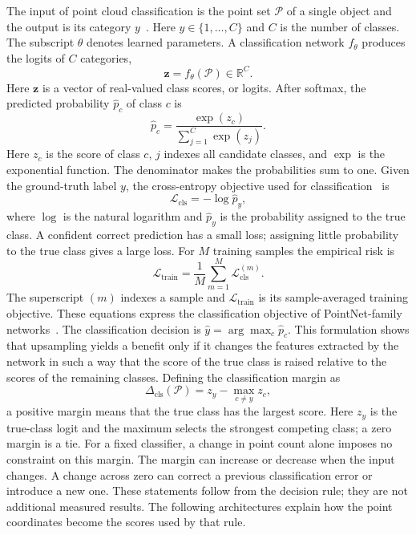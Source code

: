 The input of point cloud classification is the point set $\mathcal{P}$ of a
single object and the output is its category $y$~\cite{qi2017pointnetpp,qi2017pointnet}. Here $y\in\{1,\ldots,C\}$ and $C$ is the number of classes. The subscript $\theta$ denotes learned parameters. A classification network
$f_\theta$ produces the logits of $C$ categories,
%
\begin{equation}
    \label{eq:logits}
    \mathbf{z} = f_\theta(\mathcal{P}) \in \mathbb{R}^{C}.
\end{equation}
%
Here $\mathbf z$ is a vector of real-valued class scores, or logits. After softmax, the predicted probability $\hat p_c$ of class $c$ is
%
\begin{equation}
    \label{eq:softmax}
    \hat{p}_c = \frac{\exp(z_c)}{\sum_{j=1}^{C} \exp(z_j)} .
\end{equation}
%
Here $z_c$ is the score of class $c$, $j$ indexes all candidate classes, and $\exp$ is the exponential function. The denominator makes the probabilities sum to one. Given the ground-truth label $y$, the cross-entropy objective used for classification~\cite{qi2017pointnet} is
%
\begin{equation}
    \label{eq:cross_entropy}
    \mathcal{L}_{\mathrm{cls}} = -\log \hat{p}_y ,
\end{equation}
%
where $\log$ is the natural logarithm and $\hat p_y$ is the probability assigned to the true class. A confident correct prediction has a small loss; assigning little probability to the true class gives a large loss. For $M$ training samples the empirical risk is
%
\begin{equation}
    \label{eq:empirical_risk}
    \mathcal{L}_{\mathrm{train}}
    = \frac{1}{M} \sum_{m=1}^{M} \mathcal{L}_{\mathrm{cls}}^{(m)} .
\end{equation}
%
The superscript $(m)$ indexes a sample and $\mathcal L_{\mathrm{train}}$ is its sample-averaged training objective. These equations express the classification objective of PointNet-family networks~\cite{qi2017pointnetpp,qi2017pointnet}. The classification decision is $\hat{y} = \arg\max_c \hat{p}_c$. This
formulation shows that upsampling yields a benefit only if it changes the
features extracted by the network in such a way that the score of the true
class is raised relative to the scores of the remaining classes. Defining
the classification margin as
%
\begin{equation}
    \label{eq:margin}
    \Delta_{\mathrm{cls}}(\mathcal{P}) = z_y - \max_{c \neq y} z_c ,
\end{equation}
%
a positive margin means that the true class has the largest score. Here
$z_y$ is the true-class logit and the maximum selects the strongest competing
class; a zero margin is a tie. For a fixed classifier, a change in point
count alone imposes no constraint on this margin. The margin can increase or decrease when the input changes. A change
across zero can correct a previous classification error or introduce a
new one. These statements follow from the decision rule; they are not
additional measured results. The
following architectures explain how the point coordinates become the scores
used by that rule.

